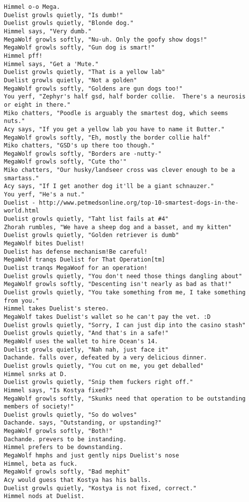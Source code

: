 \begin{verbatim}
Himmel o-o Mega.
Duelist growls quietly, "Is dumb!"
Duelist growls quietly, "Blonde dog."
Himmel says, "Very dumb."
MegaWolf growls softly, "Nu-uh. Only the goofy show dogs!"
MegaWolf growls softly, "Gun dog is smart!"
Himmel pff!
Himmel says, "Get a 'Mute."
Duelist growls quietly, "That is a yellow lab"
Duelist growls quietly, "Not a golden"
MegaWolf growls softly, "Goldens are gun dogs too!"
You yerf, "Zephyr's half gsd, half border collie.  There's a neurosis or eight in there."
Miko chatters, "Poodle is arguably the smartest dog, which seems nuts."
Acy says, "If you get a yellow lab you have to name it Butter."
MegaWolf growls softly, "Eh, mostly the border collie half"
Miko chatters, "GSD's up there too though."
MegaWolf growls softly, "Borders are -nutty-"
MegaWolf growls softly, "Cute tho'"
Miko chatters, "Our husky/landseer cross was clever enough to be a smartass."
Acy says, "If I get another dog it'll be a giant schnauzer."
You yerf, "He's a nut."
Duelist - http://www.petmedsonline.org/top-10-smartest-dogs-in-the-world.html
Duelist growls quietly, "Taht list fails at #4"
Zhorah rumbles, "We have a sheep dog and a basset, and my kitten"
Duelist growls quietly, "Golden retriever is dumb"
MegaWolf bites Duelist!
Duelist has defense mechanism!Be careful!
MegaWolf tranqs Duelist for That Operation[tm]
Duelist tranqs MegaWoof for an operation!
Duelist growls quietly, "You don't need those things dangling about"
MegaWolf growls softly, "Descenting isn't nearly as bad as that!"
Duelist growls quietly, "You take something from me, I take something from you."
Himmel takes Duelist's stereo.
MegaWolf takes Duelist's wallet so he can't pay the vet. :D
Duelist growls quietly, "Sorry, I can just dip into the casino stash"
Duelist growls quietly, "And that's in a safe!"
MegaWolf uses the wallet to hire Ocean's 14.
Duelist growls quietly, "Nah nah, just face it"
Dachande. falls over, defeated by a very delicious dinner.
Duelist growls quietly, "You cut on me, you get deballed"
Himmel snrks at D.
Duelist growls quietly, "Snip them fuckers right off."
Himmel says, "Is Kostya fixed?"
MegaWolf growls softly, "Skunks need that operation to be outstanding members of society!"
Duelist growls quietly, "So do wolves"
Dachande. says, "Outstanding, or upstanding?"
MegaWolf growls softly, "Both!"
Dachande. prevers to be instanding.
Himmel prefers to be downstanding.
MegaWolf hmphs and just gently nips Duelist's nose
Himmel, beta as fuck.
MegaWolf growls softly, "Bad mephit"
Acy would guess that Kostya has his balls.
Duelist growls quietly, "Kostya is not fixed, correct."
Himmel nods at Duelist.

\end{verbatim}
